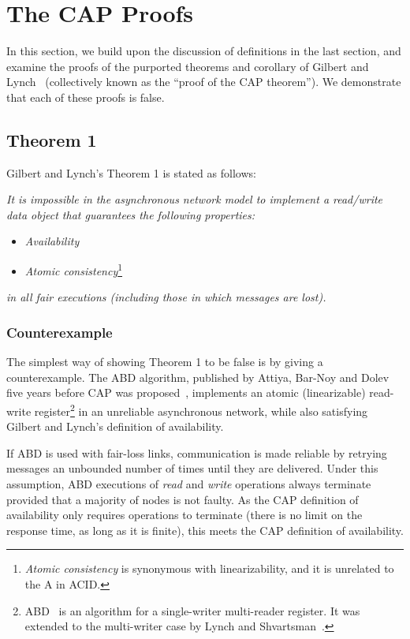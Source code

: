 \documentclass[a4paper,twocolumn,10pt]{article}
\begin{document}
\section{The CAP Proofs}\label{sec:proofs}

In this section, we build upon the discussion of definitions in the last section, and examine the
proofs of the purported theorems and corollary of Gilbert and Lynch~\cite{Gilbert2002il}
(collectively known as the ``proof of the CAP theorem''). We demonstrate that each of these proofs
is false.

\subsection{Theorem 1}\label{sec:theorem1}

Gilbert and Lynch's Theorem 1 is stated as follows:

\emph{It is impossible in the asynchronous network model to implement a read/write data object that
guarantees the following properties:}
\begin{itemize}
\item \emph{Availability}
\item \emph{Atomic consistency}\footnote{\emph{Atomic consistency} is synonymous with linearizability, and
it is unrelated to the A in ACID.}
\end{itemize}
\emph{in all fair executions (including those in which messages are lost).}

\subsubsection{Counterexample}

The simplest way of showing Theorem 1 to be false is by giving a counterexample. The ABD algorithm,
published by Attiya, Bar-Noy and Dolev five years before CAP was proposed~\cite{Attiya1995bm},
implements an atomic (linearizable) read-write register\footnote{ABD~\cite{Attiya1995bm} is an
algorithm for a single-writer multi-reader register. It was extended to the multi-writer case by
Lynch and Shvartsman~\cite{Lynch1997gr}.} in an unreliable asynchronous network, while also
satisfying Gilbert and Lynch's definition of availability.

If ABD is used with fair-loss links, communication is made reliable by retrying messages an
unbounded number of times until they are delivered. Under this assumption, ABD executions of
\emph{read} and \emph{write} operations always terminate provided that a majority of nodes is not
faulty. As the CAP definition of availability only requires operations to terminate (there is no
limit on the response time, as long as it is finite), this meets the CAP definition of availability.
\end{document}
